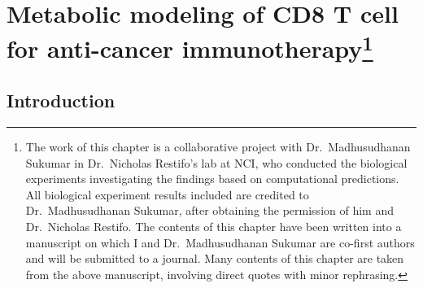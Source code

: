 \documentclass[12pt,twoside,openany,\mydriver]{thesis}  %
\begin{document}
\hypertarget{ucp2}{%
\chapter[Metabolic modeling of CD8 T cell for anti-cancer immunotherapy]{\texorpdfstring{Metabolic modeling of CD8 T cell for anti-cancer immunotherapy\footnote{The work of this chapter is a collaborative project with Dr.~Madhusudhanan Sukumar in Dr.~Nicholas Restifo's lab at NCI, who conducted the biological experiments investigating the findings based on computational predictions. All biological experiment results included are credited to Dr.~Madhusudhanan Sukumar, after obtaining the permission of him and Dr.~Nicholas Restifo. The contents of this chapter have been written into a manuscript on which I and Dr.~Madhusudhanan Sukumar are co-first authors and will be submitted to a journal. Many contents of this chapter are taken from the above manuscript, involving direct quotes with minor rephrasing.}}{Metabolic modeling of CD8 T cell for anti-cancer immunotherapy}}\label{ucp2}}

\hypertarget{introduction-1}{%
\section{Introduction}\label{introduction-1}}
\end{document}
